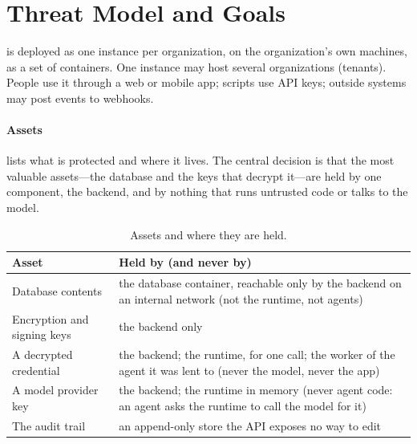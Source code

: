 \section{Threat Model and Goals}
\label{sec:threat}

\sys{} is deployed as one instance per organization, on the
organization's own machines, as a set of containers. One instance may
host several organizations (tenants). People use it through a web or
mobile app; scripts use API keys; outside systems may post events to
webhooks.

\paragraph{Assets}
 lists what is protected and where it lives. The
central decision is that the most valuable assets---the database and
the keys that decrypt it---are held by one component, the backend, and
by nothing that runs untrusted code or talks to the model.

\begin{table}[t]
\centering\small
\caption{Assets and where they are held.}
\label{tab:assets}
\begin{tabularx}{\columnwidth}{@{}>{\raggedright\arraybackslash}p{}>{\raggedright\arraybackslash}X@{}}
\toprule
\textbf{Asset} & \textbf{Held by (and never by)} \\
\midrule
Database contents & the database container, reachable only by the backend on an internal network (not the runtime, not agents) \\
Encryption and signing keys & the backend only \\
A decrypted credential & the backend; the runtime, for one call; the worker of the agent it was lent to (never the model, never the app) \\
A model provider key & the backend; the runtime in memory (never agent code: an agent asks the runtime to call the model for it) \\
The audit trail & an append-only store the API exposes no way to edit \\
\bottomrule
\end{tabularx}
\end{table}

